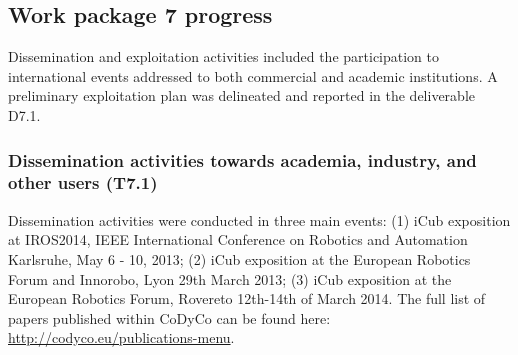 \documentclass[12pt,a4paper,twoside]{article}
\begin{document}

\subsection{Work package 7 progress}

Dissemination and exploitation activities included the participation to international events addressed to both commercial and academic institutions. A preliminary exploitation plan was delineated and reported in the deliverable D7.1.

\subsubsection{Dissemination activities towards academia, industry, and other users (T7.1)}

Dissemination activities were conducted in three main events: (1) iCub exposition at IROS2014, IEEE International Conference on Robotics and Automation Karlsruhe, May 6 - 10, 2013; (2) iCub exposition at the European Robotics Forum and Innorobo, Lyon 29th March 2013; (3) iCub exposition at the European Robotics Forum, Rovereto 12th-14th of March 2014. The full list of papers published within CoDyCo can be found here: \url{http://codyco.eu/publications-menu}.
\end{document}

